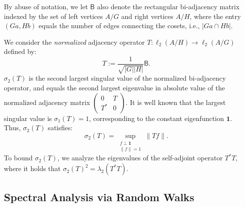 \documentclass[11pt]{article}
\theoremstyle{plain}
\theoremstyle{definition}
\begin{document}
By abuse of notation, we let $\mathsf{B}$ also denote the rectangular bi-adjacency matrix indexed by the set of left vertices $A/G$ and right vertices $A/H$, where the entry $(Ga, Hb)$ equals the number of edges connecting the cosets, i.e., $|Ga \cap Hb|$.

We consider the \emph{normalized} adjacency operator $T: \ell_2(A/H) \to \ell_2(A/G)$ defined by:
\[
    T := \frac{1}{\sqrt{|G||H|}}\mathsf{B}.
\]
$\sigma_2(T)$ is the second largest singular value of the normalized bi-adjacency operator, and equals the second largest eigenvalue in absolute value of the normalized adjacency matrix
$\begin{pmatrix}
0 & T \\
T^* & 0 
\end{pmatrix}
$.
It is well known that the largest singular value is $\sigma_1(T) = 1$, corresponding to the constant eigenfunction $\mathbf{1}$. Thus, $\sigma_2(T)$ satisfies:
\[
    \sigma_2(T) = \sup_{\substack{f \perp \mathbf{1} \\ \|f\|=1}} \|Tf\|.
\]
To bound $\sigma_2(T)$, we analyze the eigenvalues of the self-adjoint operator $T^* T$, where it holds  that $\sigma_2(T)^2 = \lambda_2(T^* T)$.

\subsection{Spectral Analysis via Random Walks}
\end{document}
